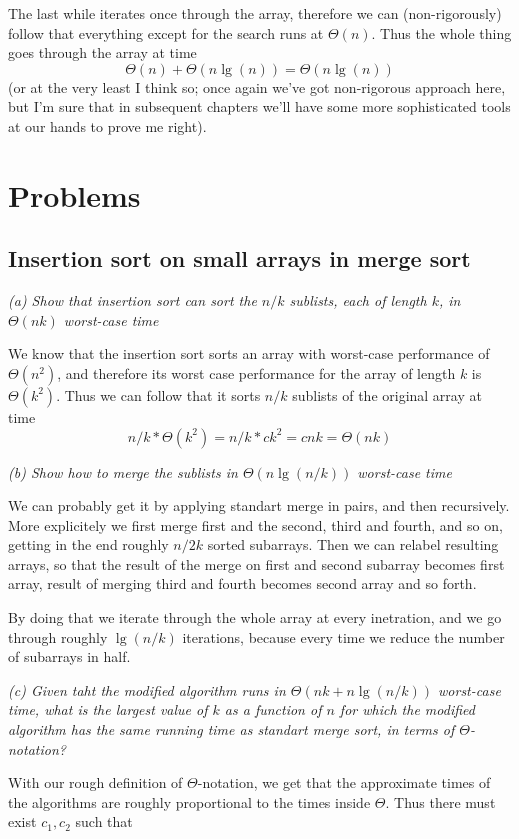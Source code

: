 \documentclass[11pt,oneside,titlepage]{book}
\begin{document}
The last while iterates once through the array, therefore we can (non-rigorously) follow that
everything except for the search runs at $\Theta(n)$. Thus the whole thing goes
through the array at time
$$\Theta(n) + \Theta(n \lg(n)) = \Theta(n \lg(n))$$
(or at the very least I think so; once again we've
got non-rigorous approach here, but I'm sure that in subsequent chapters we'll have some
more sophisticated tools at our hands to prove me right).


\section{Problems}

\subsection{Insertion sort on small arrays in merge sort}

\textit{(a) Show that insertion sort can sort the $n/k$ sublists, each of length $k$,
  in $\Theta(nk)$ worst-case time}

We know that the insertion sort sorts an array with worst-case performance of
$\Theta(n^2)$, and therefore its worst case performance for the
array of length $k$ is $\Theta(k^2)$. Thus we can follow that it sorts
$n/k$ sublists of the original array at time
$$n/k * \Theta(k^2) = n/k * ck^2 = cnk = \Theta(nk)$$

\textit{(b) Show how to merge the sublists in $\Theta(n \lg(n/k))$ worst-case
  time}

We can probably get it by applying standart merge in pairs, and then recursively. More
explicitely we first merge first and the second, third and fourth, and so on, getting in the
end roughly $n/2k$ sorted subarrays. Then we can relabel resulting arrays, so that
the result of the merge on first and second subarray becomes first array, result of
merging third and fourth becomes second array and so forth.

By doing that we iterate through the whole array at every inetration, and we go through roughly
$\lg(n/k)$ iterations, because every time we reduce the number of subarrays in half.

\textit{(c) Given taht the modified algorithm runs in $\Theta(nk + n\lg(n/k))$ worst-case time,
  what is the largest value of $k$ as a function of $n$ for which the modified algorithm has the
  same running time as standart merge sort, in terms of $\Theta$-notation?}

With our rough definition of $\Theta$-notation, we get that the approximate times of the
algorithms are roughly proportional to the times inside $\Theta$. Thus there must exist
$c_1, c_2$ such that
\end{document}
